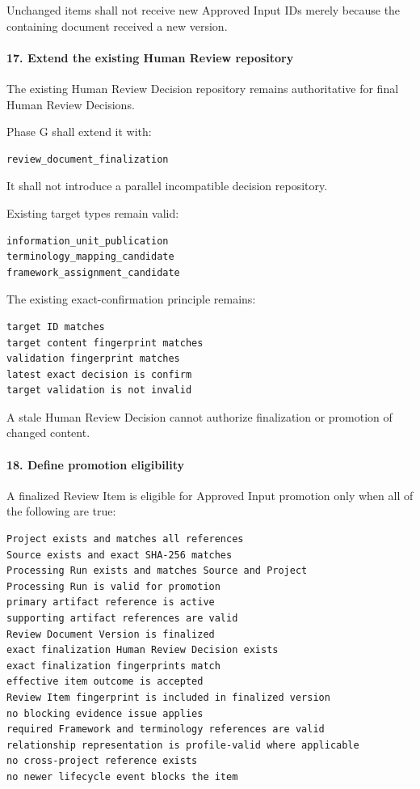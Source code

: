 Unchanged items shall not receive new Approved Input IDs merely because the containing document received a new version.

\hypertarget{17-extend-the-existing-human-review-repository}{%
\paragraph{17. Extend the existing Human Review repository}\label{17-extend-the-existing-human-review-repository}}

The existing Human Review Decision repository remains authoritative for final Human Review Decisions.

Phase G shall extend it with:

\begin{verbatim}
review_document_finalization
\end{verbatim}

It shall not introduce a parallel incompatible decision repository.

Existing target types remain valid:

\begin{verbatim}
information_unit_publication
terminology_mapping_candidate
framework_assignment_candidate
\end{verbatim}

The existing exact-confirmation principle remains:

\begin{verbatim}
target ID matches
target content fingerprint matches
validation fingerprint matches
latest exact decision is confirm
target validation is not invalid
\end{verbatim}

A stale Human Review Decision cannot authorize finalization or promotion of changed content.

\hypertarget{18-define-promotion-eligibility}{%
\paragraph{18. Define promotion eligibility}\label{18-define-promotion-eligibility}}

A finalized Review Item is eligible for Approved Input promotion only when all of the following are true:

\begin{verbatim}
Project exists and matches all references
Source exists and exact SHA-256 matches
Processing Run exists and matches Source and Project
Processing Run is valid for promotion
primary artifact reference is active
supporting artifact references are valid
Review Document Version is finalized
exact finalization Human Review Decision exists
exact finalization fingerprints match
effective item outcome is accepted
Review Item fingerprint is included in finalized version
no blocking evidence issue applies
required Framework and terminology references are valid
relationship representation is profile-valid where applicable
no cross-project reference exists
no newer lifecycle event blocks the item
\end{verbatim}

